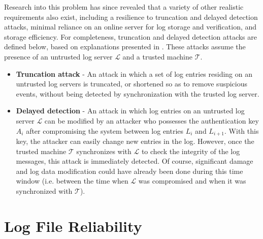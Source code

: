 \documentclass{sig-alternate}
\begin{document}
Research into this problem has since revealed that a variety of other realistic
requirements also exist, including a resilience to truncation and delayed detection attacks, 
minimal reliance on an online server for log storage and verification, and storage efficiency. 
For completeness, truncation and delayed detection attacks are defined below, based on 
explanations presented in \cite{ma2008practical}. These attacks assume the presence of an untrusted
log server $\mathcal{L}$ and a trusted machine $\mathcal{T}$.

\begin{itemize}
  \item \textbf{Truncation attack} - An attack in which a set of log entries residing on an untrusted log
servers is truncated, or shortened so as to remove suspicious events, without being detected by 
synchronization with the trusted log server.
  \item \textbf{Delayed detection} - An attack in which log entries on an untrusted log server $\mathcal{L}$ can be 
  modified by an attacker who possesses the authentication key $A_i$ after compromising the system between
  log entries $L_i$ and $L_{i+1}$. With this key, the attacker can easily change new entries in the log. However, once the trusted machine $\mathcal{T}$ synchronizes with $\mathcal{L}$ to check the integrity of the log messages, this attack is immediately detected. Of course, significant damage and log data modification could have already been done during this time window (i.e. between the time when $\mathcal{L}$ was compromised and when it was synchronized with $\mathcal{T}$).
\end{itemize}


\section{Log File Reliability}
\label{sec:LogConstruction}

\end{document}
